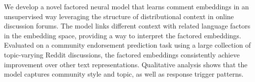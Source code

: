 We develop a novel factored neural model that learns comment embeddings in an unsupervised way leveraging the structure of distributional context in online discussion forums. The model links different context with related language factors in the embedding space, providing a way to interpret the factored embeddings. Evaluated on a community endorsement prediction task using a large collection of topic-varying Reddit discussions, the factored embeddings consistently achieve improvement over other text representations. Qualitative analysis shows that the model captures community style and topic, as well as response trigger patterns.
